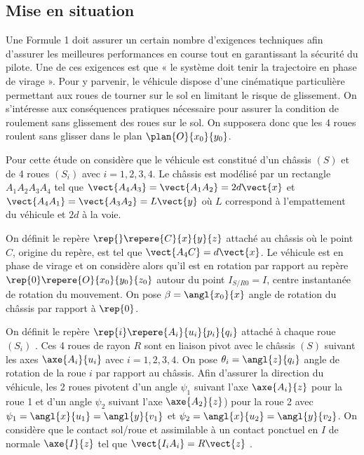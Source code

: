 \ifprof
\else
\begin{multicols}{2}
\fi

\subsection*{Mise en situation}
Une Formule 1 doit assurer un certain nombre d’exigences techniques afin d’assurer les meilleures performances en course tout en garantissant la sécurité du pilote. Une de ces exigences est que « le système doit tenir la trajectoire en phase de virage ». Pour y parvenir, le véhicule dispose d'une cinématique particulière permettant aux roues de tourner sur le sol en limitant le risque de glissement. On s'intéresse aux conséquences pratiques nécessaire pour assurer la condition de roulement sans glissement des roues sur le sol. On supposera donc que les 4 roues roulent sans glisser dans le plan
$\plan{O}{x_0}{y_0}$. 


Pour cette étude on considère que le véhicule est constitué d’un châssis \textbf{$(S)$} et de 4 roues \textbf{$(S_i)$}
 avec $i=1,2,3,4$.  Le châssis est modélisé par un rectangle $A_1A_2A_3A_4$ tel que 
 $\vect{A_4 A_3}=\vect{A_1 A_2}=2d\vect{x}$ et $\vect{A_4 A_1}=\vect{A_3 A_2}=L\vect{y}$  où $L$ correspond à l’empattement du véhicule et $2d$ à la voie. 


On définit le repère $\rep{}\repere{C}{x}{y}{z}$ attaché au châssis où le point $C$, origine du repère, est tel que 
$\vect{A_4 C}= d\vect{x}$. Le véhicule est en phase de virage et on considère alors qu’il est en rotation par rapport au
repère $\rep{0}\repere{O}{x_0}{y_0}{z_0}$ autour du point $I_{S/R0} = I$, centre instantanée de rotation du mouvement. On pose $\beta=\angl{x_0}{x}$  angle de rotation du châssis par rapport à $\rep{0}$. 

On définit le repère $\rep{i}\repere{A_i}{u_i}{p_i}{q_i}$ attaché à chaque roue $(S_i)$ . Ces 4 roues de rayon $R$ sont en
liaison pivot avec le châssis $(S)$ suivant les axes $\axe{A_i}{u_i}$ avec 
$i=1,2,3,4$. On pose $\theta_i=\angl{z}{q_i}$ angle de rotation de la roue $i$ par rapport au châssis. 
Afin d’assurer la direction du véhicule, les 2 roues pivotent d’un angle $\psi_1$ suivant l’axe $\axe{A_i}{z}$ pour la roue 1 et d’un angle $\psi_2$ suivant l’axe $\axe{A_2}{z}$) pour la roue 2 avec $\psi_1=\angl{x}{u_1}=\angl{y}{v_1}$ et $\psi_2=\angl{x}{u_2}=\angl{y}{v_2}$. 
On considère que le contact sol/roue et assimilable à un contact ponctuel en $I$ de normale $\axe{I}{z}$ tel que $\vect{I_i A_i}=R\vect{z}$ .  




\end{multicols}
